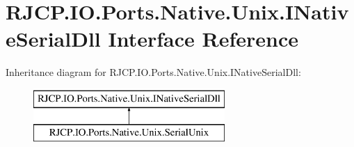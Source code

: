\hypertarget{interface_r_j_c_p_1_1_i_o_1_1_ports_1_1_native_1_1_unix_1_1_i_native_serial_dll}{}\section{R\+J\+C\+P.\+I\+O.\+Ports.\+Native.\+Unix.\+I\+Native\+Serial\+Dll Interface Reference}
\label{interface_r_j_c_p_1_1_i_o_1_1_ports_1_1_native_1_1_unix_1_1_i_native_serial_dll}
Inheritance diagram for R\+J\+C\+P.\+I\+O.\+Ports.\+Native.\+Unix.\+I\+Native\+Serial\+Dll\+:\begin{figure}[H]
\begin{center}
\leavevmode
\includegraphics[height=2.000000cm]{interface_r_j_c_p_1_1_i_o_1_1_ports_1_1_native_1_1_unix_1_1_i_native_serial_dll}
\end{center}
\end{figure}
